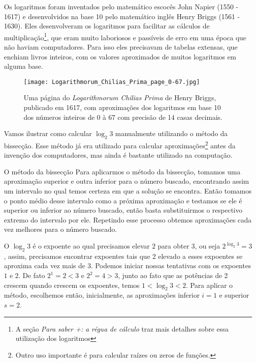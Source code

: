 

Os logaritmos foram inventados pelo matemático escocês John Napier (1550 - 1617) e desenvolvidos na base 10 pelo matemático inglês Henry Briggs (1561 - 1630). Eles desenvolveram os logaritmos para facilitar as cálculos de multiplicação\footnote{A seção \textit{Para saber +: a régua de cálculo} traz mais detalhes sobre essa utilização dos logaritmos}, que eram muito laboriosos e passíveis de erro em uma época que não haviam computadores. Para isso eles precisavam de tabelas extensas, que enchiam livros inteiros, com os valores aproximados de muitos logaritmos em alguma base.


\begin{figure}[H]
\centering
\texttt{[image: Logarithmorum\_Chilias\_Prima\_page\_0-67.jpg]}%
\caption{Uma página do \textit{Logarithmorum Chilias Prima} de Henry Briggs, publicado em 1617, com aproximações dos logaritmos em base 10 dos números inteiros de 0 à 67 com precisão de 14 casas decimais.}
\end{figure}


Vamos ilustrar como calcular $\log_2 3$ manualmente utilizando o método da bissecção. Esse método já era utilizado para calcular aproximações\footnote{Outro uso importante é para calcular raízes ou zeros de funções.} antes da invenção dos computadores, mas ainda é bastante utilizado na computação.



\begin{observationtitle}{O método da bissecção}
Para aplicarmos o método da bissecção, tomamos uma aproximação superior e outra inferior para o número buscado, encontrando assim um intervalo no qual temos certeza em que a solução se encontra. Então tomamos o ponto médio desse intervalo como a próxima aproximação e testamos se ele é superior ou inferior ao número buscado, então basta substituirmos o respectivo extremo do intervalo por ele. Repetindo esse processo obtemos aproximações cada vez melhores para o número buscado.
\end{observationtitle}


O $\log_2 3$ é o expoente ao qual precisamos elevar $2$ para obter $3$, ou seja $2^{\log_2 3} = 3$, assim, precisamos encontrar expoentes tais que 2 elevado a esses expoentes se aproxima cada vez mais de 3.  Podemos iniciar nossas tentativas com os expoentes $1$ e $2$. De fato $2^1=2<3$ e $2^2 = 4>3$, junto ao fato que as potências de 2 crescem quando crescem os expoentes, temos $1<\log_2 3 < 2$. Para aplicar o método, escolhemos então, inicialmente, as aproximações inferior $i=1$ e superior $s=2$.

